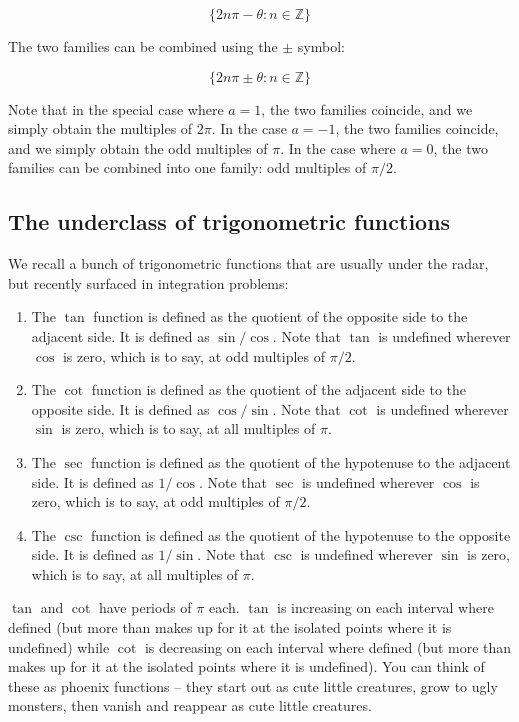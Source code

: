 \documentclass{amsart}
\begin{document}
$$\{ 2n\pi - \theta : n \in \mathbb{Z} \}$$

The two families can be combined using the $\pm$ symbol:

$$\{ 2n \pi \pm \theta : n \in \mathbb{Z} \} $$

Note that in the special case where $a = 1$, the two families
coincide, and we simply obtain the multiples of $2\pi$. In the case $a
= -1$, the two families coincide, and we simply obtain the odd
multiples of $\pi$. In the case where $a = 0$, the two families can be
combined into one family: odd multiples of $\pi/2$. 

\subsection{The underclass of trigonometric functions}

We recall a bunch of trigonometric functions that are usually under
the radar, but recently surfaced in integration problems:

\begin{enumerate}

\item The $\tan$ function is defined as the quotient of the opposite
  side to the adjacent side. It is defined as $\sin/\cos$. Note that
  $\tan$ is undefined wherever $\cos$ is zero, which is to say, at odd
  multiples of $\pi/2$.
\item The $\cot$ function is defined as the quotient of the adjacent
  side to the opposite side. It is defined as $\cos/\sin$. Note that
  $\cot$ is undefined wherever $\sin$ is zero, which is to say, at all
  multiples of $\pi$.
\item The $\sec$ function is defined as the quotient of the hypotenuse
  to the adjacent side. It is defined as $1/\cos$. Note that $\sec$ is
  undefined wherever $\cos$ is zero, which is to say, at odd multiples
  of $\pi/2$.
\item The $\csc$ function is defined as the quotient of the hypotenuse
  to the opposite side. It is defined as $1/\sin$. Note that $\csc$ is
  undefined wherever $\sin$ is zero, which is to say, at all multiples
  of $\pi$.
\end{enumerate}

$\tan$ and $\cot$ have periods of $\pi$ each. $\tan$ is increasing on
each interval where defined (but more than makes up for it at the
isolated points where it is undefined) while $\cot$ is decreasing on
each interval where defined (but more than makes up for it at the
isolated points where it is undefined). You can think of these as
phoenix functions -- they start out as cute little creatures, grow to
ugly monsters, then vanish and reappear as cute little creatures. 
\end{document}
